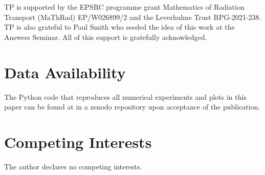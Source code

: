 \documentclass[final]{amsart}
\begin{document}
TP is supported by the EPSRC programme grant Mathematics of Radiation
Transport (MaThRad) EP/W026899/2 and the Leverhulme Trust
RPG-2021-238. TP is also grateful to Paul Smith who seeded the idea of
this work at the Answers Seminar. All of this support is gratefully
acknowledged.

\section*{Data Availability}

The Python code that reproduces all numerical experiments and plots in
this paper can be found at in a zenodo repository upon acceptance of the publication. %

\section*{Competing Interests}

The author declares no competing interests.

\printbibliography
\end{document}
